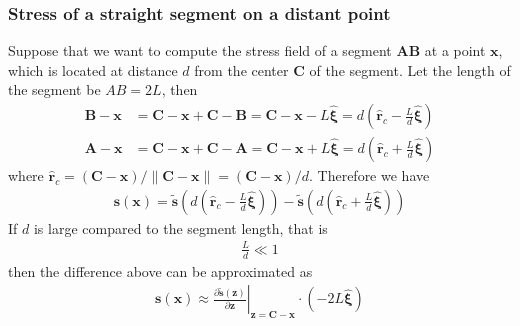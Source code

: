\documentclass[10pt]{report}
\begin{document}
{\subsubsection{Stress of a straight segment on a distant point}
Suppose that we want to compute the stress field of a segment $\bm A\bm B$ at a point $\bm x$, which is located at distance $d$ from the center $\bm C$ of the segment. Let the length of the segment be $AB=2L$, then
\begin{align}
\bm B-\bm x&=\bm C-\bm x+\bm C-\bm B=\bm C-\bm x-L\hat{\bm\xi}=d\left(\hat{\bm r}_c-\frac{L}{d}\hat{\bm\xi}\right)\\
\bm A-\bm x&=\bm C-\bm x+\bm C-\bm A=\bm C-\bm x+L\hat{\bm\xi}=d\left(\hat{\bm r}_c+\frac{L}{d}\hat{\bm\xi}\right)
\end{align}
where $\hat{\bm r}_c=(\bm C-\bm x)/\|\bm C-\bm x\|=(\bm C-\bm x)/d$. Therefore we have
\begin{align}
\bm s(\bm x)=\tilde {\bm s}\left(d\left(\hat{\bm r}_c-\frac{L}{d}\hat{\bm\xi}\right)\right)-
\tilde {\bm s}\left(d\left(\hat{\bm r}_c+\frac{L}{d}\hat{\bm\xi}\right)\right)
\end{align}
If $d$ is large compared to the segment length, that is 
\begin{align}
\frac{L}{d}\ll1
\end{align}
then the difference above can be approximated  as
\begin{align}
\bm s(\bm x)\approx \left.\frac{\partial \tilde {\bm s}(\bm z)}{\partial \bm z}\right|_{\bm z=\bm C-\bm x}\cdot(-2L\hat{\bm \xi})

\end{align}}
\end{document}
